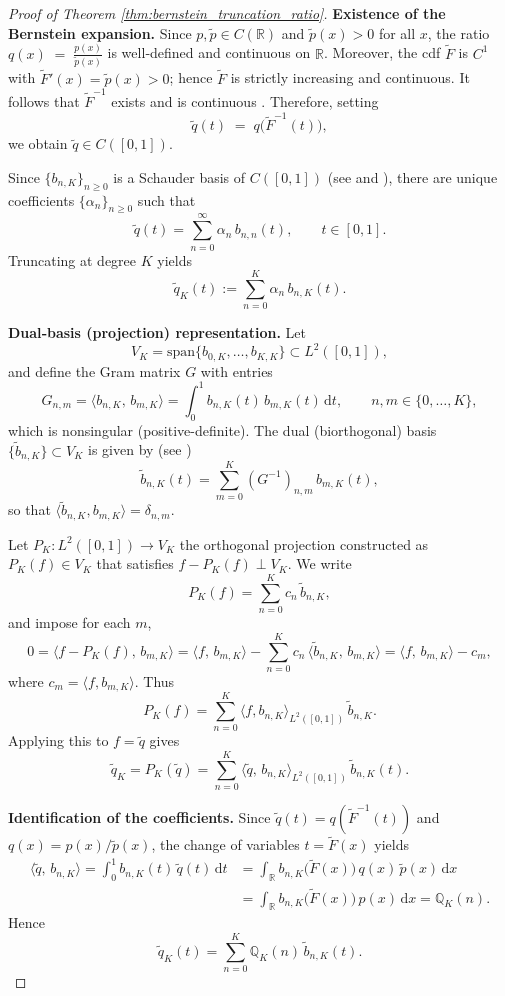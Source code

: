\documentclass{article}
\begin{document}
\begin{proof}[Proof of Theorem \ref{thm:bernstein_truncation_ratio}]

\medskip\noindent  
\textbf{Existence of the Bernstein expansion.}  
Since \(p,\tilde p\in C(\mathbb{R})\) and \(\tilde p(x)>0\) for all \(x\), the ratio $q(x)\;=\;\frac{p(x)}{\tilde p(x)}$ is well‐defined and continuous on \(\mathbb{R}\).  Moreover, the cdf $\tilde{F}$ is \(C^1\) with \(\tilde F'(x)=\tilde p(x)>0\); hence \(\tilde F\) is strictly increasing and continuous.  It follows that
\(\tilde F^{-1}\) exists and is continuous .  Therefore, setting
\[
\tilde q(t)\;=\;q\bigl(\tilde F^{-1}(t)\bigr),
\]
we obtain \(\tilde q\in C([0,1])\).

Since \(\{b_{n,K}\}_{n\ge0}\) is a Schauder basis of \(C([0,1])\) (see \cite[Theorem 1.1.1]{lorentz2012bernstein} and \cite[Chapter 4]{megginson2012introduction}), there are unique coefficients \(\{\alpha_n\}_{n\ge0}\) such that
\[
\tilde q(t)
=\sum_{n=0}^\infty \alpha_n\,b_{n,n}(t),
\qquad t\in[0,1].
\]
Truncating at degree \(K\) yields
\[
\tilde q_K(t)
:=\sum_{n=0}^K \alpha_n\,b_{n,K}(t).
\]

\medskip\noindent  
\textbf{Dual‐basis (projection) representation.} Let 
\[
V_K=\mathrm{span}\{b_{0,K},\dots,b_{K,K}\}\subset L^2([0,1]),
\]
and define the Gram matrix $G$ with entries
\[
G_{n,m}
=\bigl\langle b_{n,K},\,b_{m,K}\bigr\rangle
=\int_0^1 b_{n,K}(t)\,b_{m,K}(t)\,\mathrm{d}t, \qquad n,m\in \{0,\ldots,K\},
\]
which is nonsingular (positive-definite).  The dual (biorthogonal) basis \(\{\tilde b_{n,K}\}\subset V_K\) is given by (see \cite[Section 2]{jiittler1998dual})
\[
\tilde b_{n,K}(t)
=\sum_{m=0}^K (G^{-1})_{n,m}\,b_{m,K}(t),
\]
so that \(\langle\tilde b_{n,K},b_{m,K}\rangle=\delta_{n,m}\).

Let \(P_K:L^2([0,1])\to V_K\) the orthogonal projection constructed as \(P_K(f)\in V_K\) that satisfies \(f-P_K(f)\perp V_K\). We write
\[
P_K(f)=\sum_{n=0}^K c_n\,\tilde b_{n,K},
\]
and impose for each $m$,
\[
0
=\bigl\langle f-P_K(f),\,b_{m,K}\bigr\rangle =\bigl\langle f,\,b_{m,K}\bigr\rangle
          - \sum_{n=0}^K c_n\,\bigl\langle \tilde b_{n,K},\,b_{m,K}\bigr\rangle
=\bigl\langle f,\,b_{m,K}\bigr\rangle 
- c_m,
\]
where \(c_m=\langle f,b_{m,K}\rangle\).  Thus
\[
P_K(f)
=\sum_{n=0}^K \bigl\langle f,b_{n,K}\bigr\rangle_{L^2([0,1])}\,\tilde b_{n,K}.
\]
Applying this to \(f=\tilde q\) gives
\[
\tilde q_K
=P_K(\tilde q)
=\sum_{n=0}^K 
\bigl\langle \tilde q,\,b_{n,K}\bigr\rangle_{L^2([0,1])}
\,\tilde b_{n,K}(t).
\]

\medskip\noindent  
\textbf{Identification of the coefficients.}  
Since \(\tilde q(t)=q(\tilde F^{-1}(t))\) and \(q(x)=p(x)/\tilde p(x)\), the change of variables \(t=\tilde F(x)\) yields
\begin{align*}
\bigl\langle \tilde q,\,b_{n,K}\bigr\rangle
=\int_0^1 b_{n,K}(t)\,\tilde q(t)\,\mathrm{d}t
&=\int_\mathbb{R} b_{n,K}\bigl(\tilde F(x)\bigr)\,q(x)\,\tilde p(x)\,\mathrm{d}x
\\&=\int_\mathbb{R} b_{n,K}\bigl(\tilde F(x)\bigr)\,p(x)\,\mathrm{d}x
=\mathbb{Q}_K(n).
\end{align*}
Hence
\[
\tilde q_K(t)
=\sum_{n=0}^K \mathbb{Q}_K(n)\,\tilde b_{n,K}(t).
\]
\end{proof}
\end{document}
